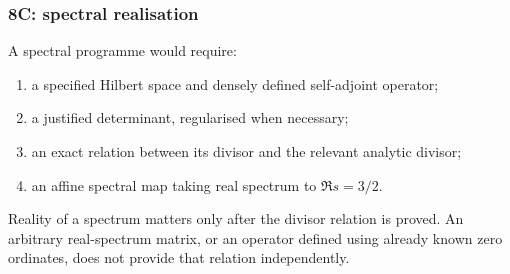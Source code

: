 \documentclass[11pt]{amsart}
\numberwithin{equation}{section}
\theoremstyle{plain}
\theoremstyle{definition}
\theoremstyle{remark}
\begin{document}
\subsubsection{8C: spectral realisation}
\label{subsubsec:a12-spectral}
A spectral programme would require:
\begin{enumerate}[label=(\roman*)]
\item a specified Hilbert space and densely defined self-adjoint operator;
\item a justified determinant, regularised when necessary;
\item an exact relation between its divisor and the relevant analytic divisor;
\item an affine spectral map taking real spectrum to $\Re s=3/2$.
\end{enumerate}
Reality of a spectrum matters only after the divisor relation is proved.
An arbitrary real-spectrum matrix, or an operator defined using already
known zero ordinates, does not provide that relation independently.
\end{document}
